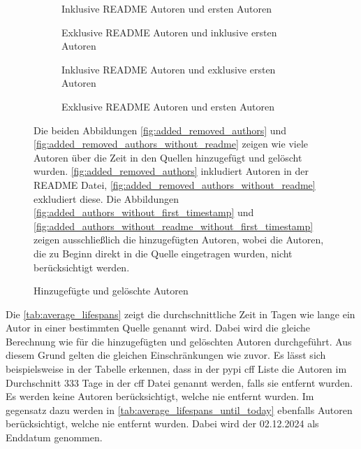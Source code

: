 \begin{figure}
    \begin{subfigure}{.5\textwidth}
        \centering
        
        \caption{Inklusive README Autoren und ersten Autoren}
        \label{fig:added_removed_authors}
    \end{subfigure}%
    \begin{subfigure}{.5\textwidth}
        \centering
        
        \caption{Exklusive README Autoren und inklusive ersten Autoren}
        \label{fig:added_removed_authors_without_readme}
    \end{subfigure}
    \begin{subfigure}{.5\textwidth}
        \centering
        
        \caption{Inklusive README Autoren und exklusive ersten Autoren}
        \label{fig:added_authors_without_first_timestamp}
    \end{subfigure}%
    \begin{subfigure}{.5\textwidth}
        \centering
        
        \caption{Exklusive README Autoren und ersten Autoren}
        \label{fig:added_authors_without_readme_without_first_timestamp}
    \end{subfigure}
    \caption{Hinzugefügte und gelöschte Autoren}
    \label{fig:added_removed_authors}
    \small
    Die beiden Abbildungen \autoref{fig:added_removed_authors} und \autoref{fig:added_removed_authors_without_readme} zeigen wie viele Autoren über die Zeit in den Quellen hinzugefügt und gelöscht wurden. \autoref{fig:added_removed_authors} inkludiert Autoren in der README Datei, \autoref{fig:added_removed_authors_without_readme} exkludiert diese. Die Abbildungen \autoref{fig:added_authors_without_first_timestamp} und \autoref{fig:added_authors_without_readme_without_first_timestamp} zeigen ausschließlich die hinzugefügten Autoren, wobei die Autoren, die zu Beginn direkt in die Quelle eingetragen wurden, nicht berücksichtigt werden.
\end{figure}

Die \autoref{tab:average_lifespans} zeigt die durchschnittliche Zeit in Tagen wie lange ein Autor in einer bestimmten Quelle genannt wird.
Dabei wird die gleiche Berechnung wie für die hinzugefügten und gelöschten Autoren durchgeführt.
Aus diesem Grund gelten die gleichen Einschränkungen wie zuvor.
Es lässt sich beispielsweise in der Tabelle erkennen, dass in der \gls{pypi} \gls{cff} Liste die Autoren im Durchschnitt 333 Tage in der \gls{cff} Datei genannt werden, falls sie entfernt wurden.
Es werden keine Autoren berücksichtigt, welche nie entfernt wurden.
Im gegensatz dazu werden in \autoref{tab:average_lifespans_until_today} ebenfalls Autoren berücksichtigt, welche nie entfernt wurden. Dabei wird der 02.12.2024 als Enddatum genommen.

